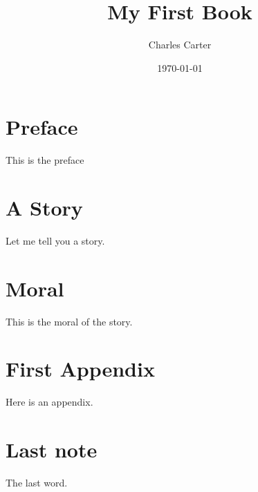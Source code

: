 \documentclass[letterpaper]{book}
\title{My First Book}
\author{Charles Carter}
\date{\today{}}
\begin{document}
\frontmatter
\maketitle
\tableofcontents{}
\chapter{Preface}
This  is the preface
\mainmatter
    \chapter{A Story}
    Let me tell you a story.
    \chapter{Moral}
    This is the moral of the story. 
\appendix
    \chapter{First Appendix}
    Here is an appendix.
\backmatter
    \chapter{Last note}
    The last word.
\end{document}
